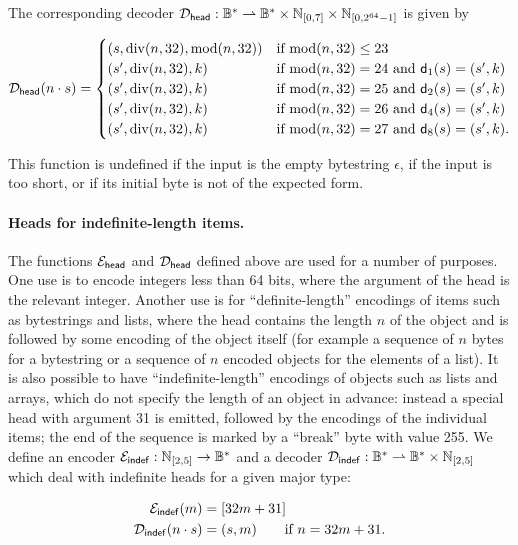 \noindent The corresponding decoder $\mathcal{D}_{\mathsf{head}}: \mathbb{B}^* \rightharpoonup \mathbb{B}^* \times
\mathbb{N}_{[0,7]} \times \mathbb{N}_{[0,2^{64}-1]}$ is given by 

$$
  \mathcal{D}_{\mathsf{head}}(n \cdot s) =
  \begin{cases}
    (s, \operatorname{div}(n,32), \operatorname{mod}(n,32)) & \text{if $\operatorname{mod}(n,32) \leq 23$}\\
    (s', \operatorname{div}(n,32), k) & \text{if $\operatorname{mod}(n,32) = 24$ and $\mathsf{d}_1(s) = (s', k)$}\\
    (s', \operatorname{div}(n,32), k) & \text{if $\operatorname{mod}(n,32) = 25$ and $\mathsf{d}_2(s) = (s', k)$}\\
    (s', \operatorname{div}(n,32), k) & \text{if $\operatorname{mod}(n,32) = 26$ and $\mathsf{d}_4(s) = (s', k)$}\\
    (s', \operatorname{div}(n,32), k) & \text{if $\operatorname{mod}(n,32) = 27$ and $\mathsf{d}_8(s) = (s', k)$}.
  \end{cases}
$$

\noindent This function is undefined if the input is the empty bytestring
$\epsilon$, if the input is too short, or if its initial byte is not of the
expected form.

\paragraph{Heads for indefinite-length items.}
The functions $\mathcal{E}_{\mathsf{head}}$ and $\mathcal{D}_{\mathsf{head}}$ defined above are used for a number of
purposes.  One use is to encode integers less than 64 bits, where the argument
of the head is the relevant integer.  Another use is for ``definite-length''
encodings of items such as bytestrings and lists, where the head contains the
length $n$ of the object and is followed by some encoding of the object itself
(for example a sequence of $n$ bytes for a bytestring or a sequence of $n$
encoded objects for the elements of a list).  It is also possible to have
``indefinite-length'' encodings of objects such as lists and arrays, which do
not specify the length of an object in advance: instead a special head with
argument 31 is emitted, followed by the encodings of the individual items; the
end of the sequence is marked by a ``break'' byte with value 255.  We define an
encoder $\mathcal{E}_{\mathsf{indef}}: \mathbb{N}_{[2,5]} \rightarrow \mathbb{B}^*$ and a decoder
$\mathcal{D}_{\mathsf{indef}}: \mathbb{B}^* \rightharpoonup \mathbb{B}^* \times \mathbb{N}_{[2,5]}$ which deal
with indefinite heads for a given major type:

\begin{align*}
  \mathcal{E}_{\mathsf{indef}}(m) &= [32m+31]\\
  \mathcal{D}_{\mathsf{indef}}(n \cdot s) & = (s, m) \qquad \text{if $n = 32m+31$}.
\end{align*}
  
